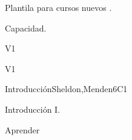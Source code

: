 
\begin{syllabus}


\begin{justification}
Plantila para cursos nuevos .
\end{justification}

\begin{goals}
\item Capacidad.
\end{goals}

\begin{outcomes}{V1}
   \item {}
\end{outcomes}

\begin{competences}{V1}
    \item {} 
\end{competences}


\begin{unit}{Introducción}{}{Sheldon,Menden}{6}{C1}
\begin{topics}
      \item Introducción I.
   \end{topics}

   \begin{learningoutcomes}
      \item Aprender
   \end{learningoutcomes}
\end{unit}





\begin{coursebibliography}
\end{coursebibliography}

\end{syllabus}
